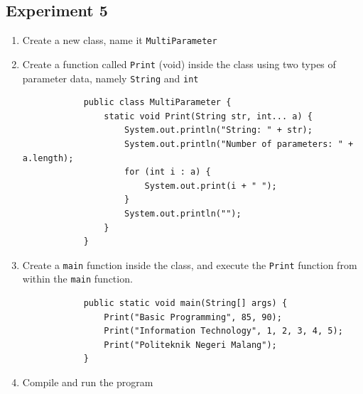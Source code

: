 \documentclass[12pt,titlepage]{article}
\begin{document}
\subsection{Experiment 5}
\begin{enumerate}
    \item Create a new class, name it \texttt{MultiParameter}
    \item {
        Create a function called \texttt{Print} (void) inside the class using two types of
        parameter data, namely \texttt{String} and \texttt{int}

        \begin{verbatim}
            public class MultiParameter {
                static void Print(String str, int... a) {
                    System.out.println("String: " + str);
                    System.out.println("Number of parameters: " + a.length);
                    for (int i : a) {
                        System.out.print(i + " ");
                    }
                    System.out.println("");
                }
            }
        \end{verbatim}
    }
    \item {
        Create a \texttt{main} function inside the class, and execute the \texttt{Print} function
        from within the \texttt{main} function.

        \begin{verbatim}
            public static void main(String[] args) {
                Print("Basic Programming", 85, 90);
                Print("Information Technology", 1, 2, 3, 4, 5);
                Print("Politeknik Negeri Malang");
            }
        \end{verbatim}
    }
    \item {
        Compile and run the program
    }
\end{enumerate}
\end{document}
